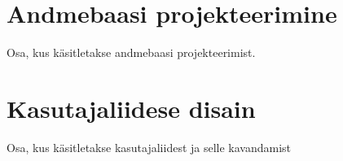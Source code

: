 



\section{Andmebaasi projekteerimine}
Osa, kus käsitletakse andmebaasi projekteerimist.

\section{Kasutajaliidese disain}
Osa, kus käsitletakse kasutajaliidest ja selle kavandamist